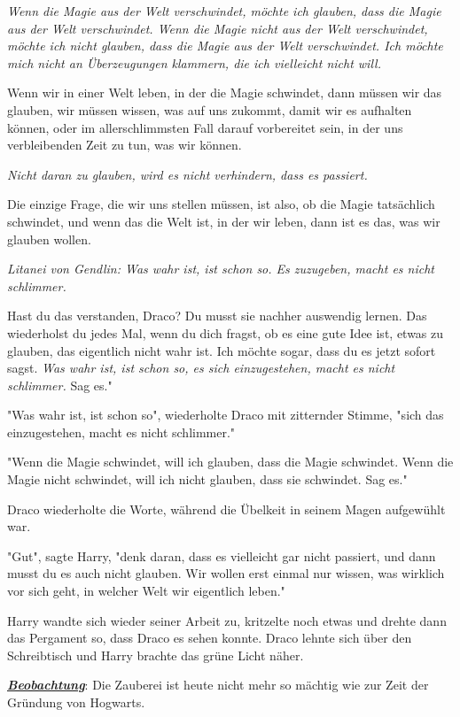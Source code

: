 {\emph{Wenn die Magie aus der Welt verschwindet, möchte ich glauben, dass die Magie aus der Welt verschwindet. Wenn die Magie nicht aus der Welt verschwindet, möchte ich nicht glauben, dass die Magie aus der Welt verschwindet. Ich möchte mich nicht an Überzeugungen klammern, die ich vielleicht nicht will.}

Wenn wir in einer Welt leben, in der die Magie schwindet, dann müssen wir das glauben, wir müssen wissen, was auf uns zukommt, damit wir es aufhalten können, oder im allerschlimmsten Fall darauf vorbereitet sein, in der uns verbleibenden Zeit zu tun, was wir können.

\emph{Nicht daran zu glauben, wird es nicht verhindern, dass es passiert.}

Die einzige Frage, die wir uns stellen müssen, ist also, ob die Magie tatsächlich schwindet, und wenn das die Welt ist, in der wir leben, dann ist es das, was wir glauben wollen.

\emph{Litanei von Gendlin: Was wahr ist, ist schon so. Es zuzugeben, macht es nicht schlimmer.}

Hast du das verstanden, Draco? Du musst sie nachher auswendig lernen. Das wiederholst du jedes Mal, wenn du dich fragst, ob es eine gute Idee ist, etwas zu glauben, das eigentlich nicht wahr ist. Ich möchte sogar, dass du es jetzt sofort sagst. \emph{Was wahr ist, ist schon so, es sich einzugestehen, macht es nicht schlimmer.} Sag es."

"Was wahr ist, ist schon so", wiederholte Draco mit zitternder Stimme, "sich das einzugestehen, macht es nicht schlimmer."

"Wenn die Magie schwindet, will ich glauben, dass die Magie schwindet. Wenn die Magie nicht schwindet, will ich nicht glauben, dass sie schwindet. Sag es."

Draco wiederholte die Worte, während die Übelkeit in seinem Magen aufgewühlt war.

"Gut", sagte Harry, "denk daran, dass es vielleicht gar nicht passiert, und dann musst du es auch nicht glauben. Wir wollen erst einmal nur wissen, was wirklich vor sich geht, in welcher Welt wir eigentlich leben."

Harry wandte sich wieder seiner Arbeit zu, kritzelte noch etwas und drehte dann das Pergament so, dass Draco es sehen konnte. Draco lehnte sich über den Schreibtisch und Harry brachte das grüne Licht näher.

\emph{\textbf{\uline{Beobachtung}}}: Die Zauberei ist heute nicht mehr so mächtig wie zur Zeit der Gründung von Hogwarts.

}
